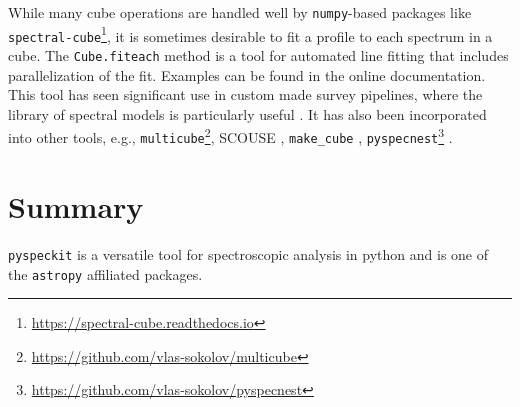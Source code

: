 \documentclass[twocolumn]{aastex63}
\newcommand{\pyspeckit}{\texttt{pyspeckit}\xspace}
\newcommand{\astropy}{\texttt{astropy}\xspace}
\begin{document}
While many cube operations are handled well by \texttt{numpy}-based packages
like \texttt{spectral-cube}\footnote{\url{https://spectral-cube.readthedocs.io}},
it is sometimes desirable to fit a profile to each spectrum
in a cube.  The \texttt{Cube.fiteach} method is a tool for automated line
fitting that includes parallelization of the fit.  Examples can be
found in the online documentation. 
This tool  has  seen significant use in 
custom made survey pipelines, where the library of spectral models is particularly useful
\citep[e.g,][\url{https://github.com/GBTAmmoniaSurvey/GAS}]{Friesen2017}. 
 It has also been incorporated into other tools, e.g.,
\texttt{multicube}\footnote{\url{https://github.com/vlas-sokolov/multicube}}, SCOUSE \citep{Henshaw2016,Henshaw2020}, \texttt{make\_cube} \citep{Youngblood2016}, \texttt{pyspecnest}\footnote{\url{https://github.com/vlas-sokolov/pyspecnest}} \citep{Sokolov2020-pyspecnest}.





\section{Summary}
\label{sec:summary}

\texttt{pyspeckit} is a versatile tool for spectroscopic analysis in python and
is one of the \astropy affiliated packages.
% 

\end{document}
